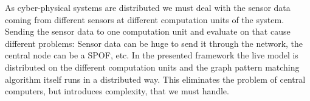As cyber-physical systems are distributed we must deal with the sensor data coming from different sensors at different computation units of the system. Sending the sensor data to one computation unit and evaluate on that cause different problems: Sensor data can be huge to send it through the network, the central node can be a SPOF, etc. In the presented framework the live model is distributed on the different computation units and the graph pattern matching algorithm itself runs in a distributed way. This eliminates the problem of central computers, but introduces complexity, that we must handle. 








